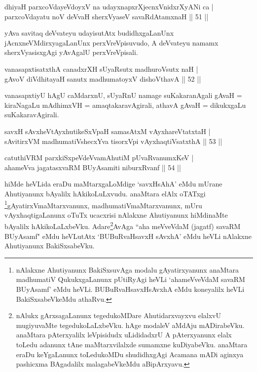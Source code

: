 
\begin{shl}
dhiyaH parxcoVdayeVdoyxV na udayxnapxrXjecnxVnidxrXyANi ca | \\
parxcoVdayatu noV deVvaH sherxVyaseV savaRdA\s \s tamxnaH \hfill|| 51 || 
\end{shl}

\begin{artha}
yAva savitaq deVvateyu udayisutAtx budidhxgaLanUnx 
jAcnxneVMdirxyagaLanUnx perxVreVpisuvudo, A deVvateyu namamx 
sherxVyasisxgAgi yAvAgalU perxVreVpisali.
\end{artha}


\begin{shl}
vanasapxtisatxthA canadxrXH sUyaRsutx madhuroV\s sutx naH | \\
gAvoV diVdhitayaH sanutx madhumatoyxV dishoV\s thavA  \hfill|| 52 || 
\end{shl}

\begin{artha}
vanasapxtiyU hAgU caMdarxnU, sUyaRnU namage suKakaranAgali gAvaH = 
kiraNagaLu mAdhimxVH = amaqtakaravAgirali, athavA gAvaH = dikukxgaLu 
suKakaravAgirali.
\end{artha}

\begin{shl}
savxH sAvxheVtAyxhutikeSxVpaH samasAtxM vAyxhareVtatxtaH | \\
sAvitirxVM madhumatiVshecxYva tisorxV\s pi vAyxhaqtiVsatxthA \hfill|| 53 || 
\end{shl}

\begin{shl}
catuthiVRM parxkiSxpeVdeVvamAhutiM pUvaRvanumxKeV | \\
ahameVva jagatasxvaRM BUyAsamiti niburxRvanf \hfill|| 54 || 
\end{shl}

\begin{artha}
hiMde heVLida eraDu maMtarxgaLoMdige `savxHsAhA' eMdu mUrane 
Ahutiyanunx bAyalilx hAkikoLuLxvudu. anaMtara elAlx oTATxgi 
\footnote{nAlakxne Ahutiyanunx BakiSxsuvAga modalu gAyatirxyanunx 
anaMtara madhumatiV QukukxgaLanunx pUtiRyAgi heVLi `ahameVveVdaM 
savaRM BUyAsamf' eMdu heVLi. BUBuRvaHsavxHsAvxhA eMdu koneyalilx heVLi 
BakiSxsabeVkeMdu athaRvu.}gAyatirxVmaMtarxvanunx, madhumatiVmaMtarxvanunx, mUru 
vAyxhaqtigaLanunx oTuTx ucacxrisi nAlakxne Ahutiyanunx hiMdinaMte 
bAyalilx hAkikoLaLxbeVku. Adare\footnote{nAlukx gArxsagaLanunx 
tegedukoMDare Ahutidarxvayxvu elalxvU mugiyuvaMte tegedukoLaLxbeVku. 
hAge modaleV aMdAju mADirabeVku. anaMtara pAterxyalilx leVpisidudx 
uLididadxrU A pAterxyanunx elalx toLedu adanunx tAne maMtarxvilalxde 
sumamxne kuDiyabeVku. anaMtara eraDu keYgaLanunx toLedukoMDu 
shudidhxgAgi Acamana mADi aginxya pashicxma BAgadalilx malagabeVkeMdu 
aBipArxyavu.}AvAga ``aha meVveVdaM 
(jagatf) savaRM BUyAsamf" eMdu heVLutAtx `BUBuRvaHsavxH sAvxhA' eMdu 
heVLi nAlakxne Ahutiyanunx BakiSxsabeVku.
\end{artha}

